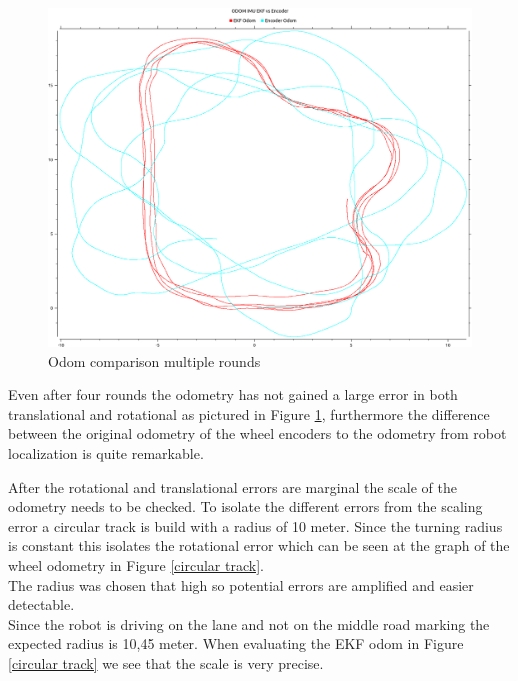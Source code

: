 \begin{figure}[H]
	\includegraphics[width=\textwidth]{Pictures/odom comp multiple rounds}
	\caption{Odom comparison multiple rounds}
	\label{Odom comparison multiple rounds}

\end{figure}

Even after four rounds the odometry has not gained a large error in both translational and rotational as pictured in Figure \ref{Odom comparison multiple rounds}, furthermore the difference between the original odometry of the wheel encoders to the odometry from robot localization is quite remarkable.

After the rotational and translational errors are marginal the scale of the odometry needs to be checked.
To isolate the different errors from the scaling error a circular track is build with a radius of 10 meter. Since the turning radius is constant this isolates the rotational error which can be seen at the graph of the wheel odometry in Figure \ref{circular track}.\\
The radius was chosen that high so potential errors are amplified and easier detectable.\\

Since the robot is driving on the lane and not on the middle road marking the expected radius is 10,45 meter. When evaluating the EKF odom in Figure \ref{circular track} we see that the scale is very precise.
 
